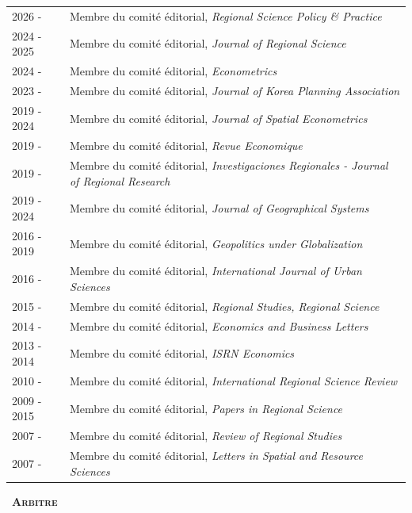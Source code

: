 \documentclass[a4paper,12pt]{article}
\newcommand{\smalltitre}[1]{%
	\noindent \textbullet~\textsc{\textbf{#1}}
	\smallskip
	}
\begin{document}
\noindent \begin{longtable}{@{}p{\annee}p{\texte}@{}}
2026 -  	& Membre du comité éditorial, \textit{Regional Science Policy \& Practice} \\
2024 - 2025 & Membre du comité éditorial, \textit{Journal of Regional Science} \\
2024 - 	& Membre du comité éditorial, \textit{Econometrics} \\
2023 - 	& Membre du comité éditorial, \textit{Journal of Korea Planning Association} \\
2019 - 2024 & Membre du comité éditorial, \textit{Journal of Spatial Econometrics} \\
2019 - 	& Membre du comité éditorial, \textit{Revue Economique} \\
2019 - 	& Membre du comité éditorial, \textit{Investigaciones Regionales - Journal of Regional Research} \\
2019 - 2024 & Membre du comité éditorial, \textit{Journal of Geographical Systems} \\
2016 - 2019 & Membre du comité éditorial, \textit{Geopolitics under Globalization} \\
2016 - 	& Membre du comité éditorial, \textit{International Journal of Urban Sciences} \\
2015 - 	& Membre du comité éditorial, \textit{Regional Studies, Regional Science} \\
2014 - 	& Membre du comité éditorial, \textit{Economics and Business Letters} \\
2013 - 2014 & Membre du comité éditorial, \textit{ISRN Economics} \\
2010 - 	& Membre du comité éditorial, \textit{International Regional Science Review} \\
2009 - 2015 & Membre du comité éditorial, \textit{Papers in Regional Science} \\
2007 - 	& Membre du comité éditorial, \textit{Review of Regional Studies} \\
2007 - 	& Membre du comité éditorial, \textit{Letters in Spatial and Resource Sciences}
\end{longtable}


\smalltitre{Arbitre} \\
\end{document}
